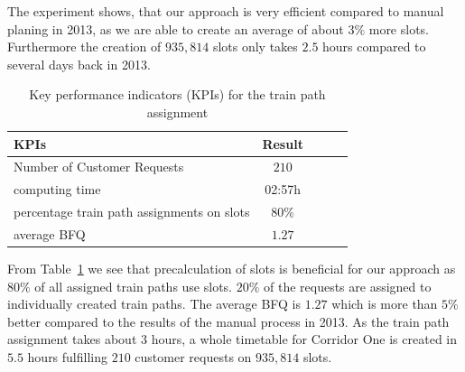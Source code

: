 The experiment shows, that our approach is very efficient compared to manual planing in 2013, as we are able to create an average of about $3\%$ more slots. Furthermore the creation of $935,814$ slots only takes $2.5$ hours compared to several days back in 2013.
\begin{table}[h]
	\centering
	\caption{Key performance indicators (KPIs) for the train path assignment}
	\label{tab:result_Netzfpl_Bel}
	\begin{tabular}{lcccc} \hline
		\textbf{KPIs}   							& \textbf{Result}  \\ \hline
		Number of Customer Requests     			& $210$                      \\
		computing time       						& 02:57h                     \\
		percentage train path assignments on slots  & $80\%$                       \\
		average BFQ 								& $1.27$                             \\ \hline
	\end{tabular}
\end{table}
\par

From Table~\ref{tab:result_Netzfpl_Bel} we see that precalculation of slots is beneficial for our approach as $80\%$ of all assigned train paths use slots. $20\%$ of the requests are assigned to individually created train paths. The average BFQ is $1.27$ which is more than $5\%$ better compared to the results of the manual process in 2013. As the train path assignment takes about $3$ hours, a whole timetable for Corridor One is created in $5.5$ hours fulfilling $210$ customer requests on $935,814$ slots.